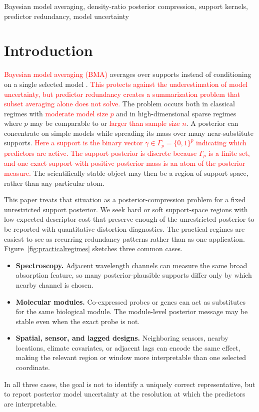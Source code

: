 \documentclass[twoside,11pt]{article}
\newcommand{\rev}[1]{\textcolor{red}{#1}}
\begin{document}
\begin{keywords} Bayesian model averaging, density-ratio posterior compression, support kernels, predictor redundancy, model uncertainty
\end{keywords}

\section{Introduction}

\rev{Bayesian model averaging (BMA)} averages over supports instead of conditioning on a single selected model \citep{hoeting1999,forte2018}. \rev{This protects against the underestimation of model uncertainty, but predictor redundancy creates a summarization problem that subset averaging alone does not solve.} The problem occurs both in classical regimes with \rev{moderate model size \(p\)} and in high-dimensional sparse regimes where \(p\) may be comparable to or \rev{larger than sample size \(n\)}. A posterior can concentrate on simple models while spreading its mass over many near-substitute supports. \rev{Here a support is the binary vector \(\gamma\in\Gamma_p=\{0,1\}^p\) indicating which predictors are active. The support posterior is discrete because \(\Gamma_p\) is a finite set, and one exact support with positive posterior mass is an atom of the posterior measure.} The scientifically stable object may then be a region of support space, rather than any particular atom.

This paper treats that situation as a posterior-compression problem for a fixed unrestricted support posterior. We seek hard or soft support-space regions with low expected descriptor cost that preserve enough of the unrestricted posterior to be reported with quantitative distortion diagnostics. The practical regimes are easiest to see as recurring redundancy patterns rather than as one application. Figure~\ref{fig:practicalregimes} sketches three common cases.
\begin{itemize}[leftmargin=1.8em,itemsep=1pt,topsep=3pt]
\item \textbf{Spectroscopy.} Adjacent wavelength channels can measure the same broad absorption feature, so many posterior-plausible supports differ only by which nearby channel is chosen.
\item \textbf{Molecular modules.} Co-expressed probes or genes can act as substitutes for the same biological module. The module-level posterior message may be stable even when the exact probe is not.
\item \textbf{Spatial, sensor, and lagged designs.} Neighboring sensors, nearby locations, climate covariates, or adjacent lags can encode the same effect, making the relevant region or window more interpretable than one selected coordinate.
\end{itemize}
In all three cases, the goal is not to identify a uniquely correct representative, but to report posterior model uncertainty at the resolution at which the predictors are interpretable.
\end{document}
